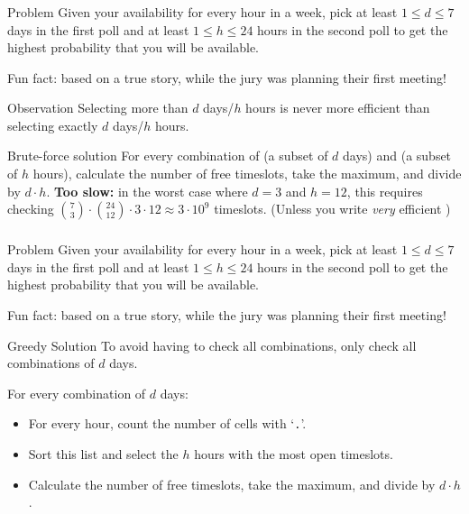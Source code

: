 \newcommand\problemblock{
    \begin{block}{Problem}
        Given your availability for every hour in a week,
        pick at least $1 \leq d \leq 7$ days in the first poll and at least $1 \leq h \leq 24$ hours in the second poll
        to get the highest probability that you will be available.

        \footnotesize Fun fact: based on a true story, while the jury was planning their first meeting!
    \end{block}
}

\begin{frame}
    \frametitle{\problemtitle}
    \problemblock
    \pause
    \begin{block}{Observation}
        Selecting more than $d$ days/$h$ hours is never more efficient than selecting exactly $d$ days/$h$ hours.
    \end{block}
    \pause
    \begin{block}{Brute-force solution}
        For every combination of (a subset of $d$ days) and (a subset of $h$ hours),
        calculate the number of free timeslots, take the maximum, and divide by $d\cdot h$.
        \pause
        \textbf{Too slow:} in the worst case where $d=3$ and $h=12$,
        this requires checking $\binom73 \cdot \binom{24}{12} \cdot 3 \cdot 12 \approx 3 \cdot 10^9$ timeslots.
        \pause
        \footnotesize (Unless you write \emph{very} efficient \cpp)
    \end{block}
\end{frame}

\begin{frame}
    \frametitle{\problemtitle}
    \problemblock
    \begin{block}{Greedy Solution}
        To avoid having to check all combinations, only check all combinations of $d$ days.
        \pause

        For every combination of $d$ days:
        \begin{itemize}
            \item For every hour, count the number of cells with `\texttt.'.
            \item Sort this list and select the $h$ hours with the most open timeslots.
            \item Calculate the number of free timeslots, take the maximum, and divide by $d\cdot h$.
        \end{itemize}
    \end{block}
    \pause
    \solvestats
\end{frame}
